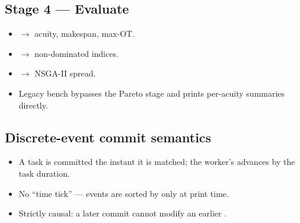 \subsection{Stage 4 --- Evaluate}

\begin{itemize}
  \item {} $\to$ acuity, makespan, max-OT.
  \item {} $\to$ non-dominated indices.
  \item {} $\to$ NSGA-II spread.
  \item Legacy bench bypasses the Pareto stage and prints
        per-acuity summaries directly.
\end{itemize}

\subsection{Discrete-event commit semantics}

\begin{itemize}
  \item A task is committed the instant it is matched; the
        worker's  advances by the task
        duration.
  \item No ``time tick'' --- events are sorted by
         only at print time.
  \item Strictly causal: a later commit cannot modify an earlier
        .
\end{itemize}
